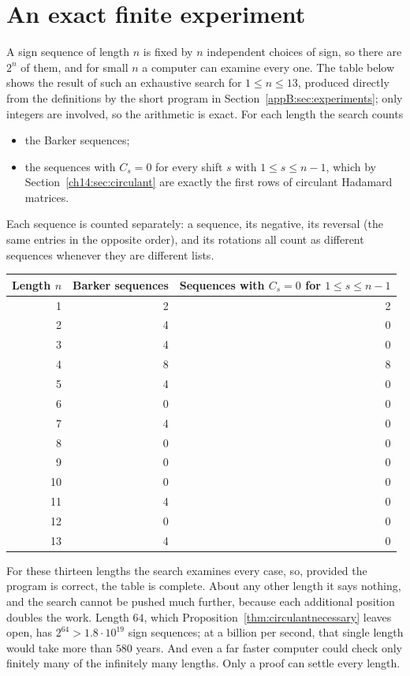 \section{An exact finite experiment}\label{ch14:sec:experiment}
A sign sequence of length $n$ is fixed by $n$ independent choices of sign, so there are $2^n$ of them, and for small $n$ a computer can examine every one. The table below shows the result of such an exhaustive search for $1\le n\le13$, produced directly from the definitions by the short program in Section~\ref{appB:sec:experiments}; only integers are involved, so the arithmetic is exact. For each length the search counts
\begin{itemize}
\item the Barker sequences;
\item the sequences with $C_s=0$ for every shift $s$ with $1\le s\le n-1$, which by Section~\ref{ch14:sec:circulant} are exactly the first rows of circulant Hadamard matrices.
\end{itemize}
Each sequence is counted separately: a sequence, its negative, its reversal (the same entries in the opposite order), and its rotations all count as different sequences whenever they are different lists.

\begin{center}
\small
\renewcommand{\arraystretch}{0.92}
\begin{tabular}{@{}r rr@{}}\toprule
Length $n$ & Barker sequences & \shortstack{Sequences with $C_s=0$\\ for $1\le s\le n-1$}\\\midrule
1&2&2\\2&4&0\\3&4&0\\4&8&8\\5&4&0\\6&0&0\\7&4&0\\8&0&0\\9&0&0\\10&0&0\\11&4&0\\12&0&0\\13&4&0\\\bottomrule
\end{tabular}
\end{center}

For these thirteen lengths the search examines every case, so, provided the program is correct, the table is complete. About any other length it says nothing, and the search cannot be pushed much further, because each additional position doubles the work. Length $64$, which Proposition~\ref{thm:circulantnecessary} leaves open, has $2^{64}>1.8\cdot10^{19}$ sign sequences; at a billion per second, that single length would take more than $580$ years. And even a far faster computer could check only finitely many of the infinitely many lengths. Only a proof can settle every length.

